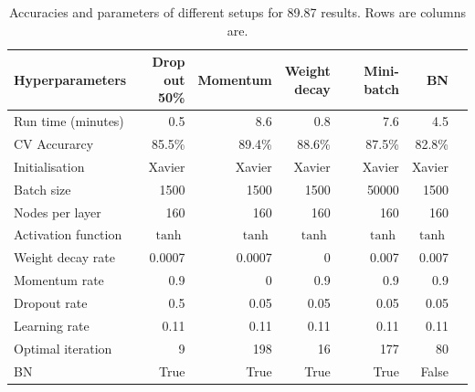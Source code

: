 \begin{table}
\caption{Accuracies and parameters of different setups for 89.87 results. Rows are columns are.\label{tb:comp}}
{\footnotesize \centering
\begin{tabular}{@{}lrrrrrr@{}}
\toprule
Hyperparameters             & {\parbox[t]{1.3cm}{\raggedleft Drop \\out 50\%}  } 
& Momentum & {\parbox[t]{1.3cm}{\raggedleft Weight \\decay}} & Mini-batch & BN \\ \midrule
Run time (minutes)             & 0.5        & 8.6          & 0.8      & 7.6 & 4.5          \\
CV Accurarcy                   & 85.5\%     & 89.4\%       & 88.6\%   & 87.5\% &82.8\%       \\
Initialisation              & Xavier     & Xavier       & Xavier   & Xavier & Xavier        \\
Batch size                   & 1500       & 1500         & 1500     & 50000    & 1500        \\
Nodes per layer        & 160        & 160          & 160      & 160    & 160         \\
Activation function        & $\tanh$    & $\tanh$      & $\tanh$  & $\tanh$  & $\tanh$       \\
Weight decay rate          & 0.0007     & 0.0007       & 0        & 0.007  & 0.007        \\
Momentum rate                & 0.9        & 0            & 0.9      & 0.9    & 0.9         \\
Dropout rate                & 0.5        & 0.05         & 0.05     & 0.05    & 0.05        \\
Learning rate                & 0.11       & 0.11         & 0.11     & 0.11    & 0.11       \\
Optimal iteration       & 9          & 198          & 16       & 177     & 80       \\ 
BN       & True          & True          & True       & True     & False       \\ \bottomrule
\end{tabular}
}
\end{table}

